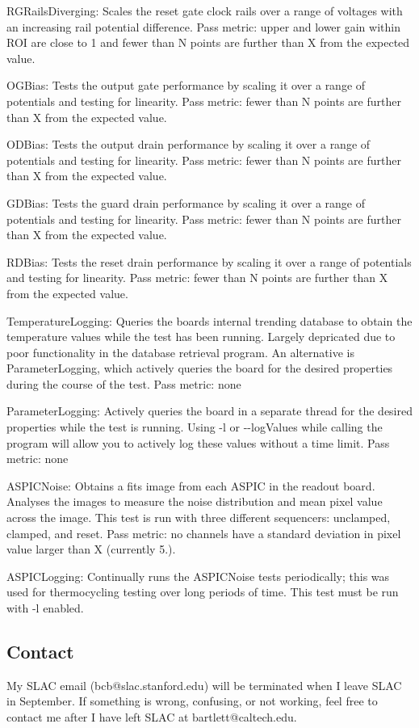\begin{DoxyItemize}
\item {\ttfamily R\+G\+Rails\+Diverging}\+: Scales the reset gate clock rails over a range of voltages with an increasing rail potential difference. Pass metric\+: upper and lower gain within R\+OI are close to 1 and fewer than N points are further than X from the expected value.
\item {\ttfamily O\+G\+Bias}\+: Tests the output gate performance by scaling it over a range of potentials and testing for linearity. Pass metric\+: fewer than N points are further than X from the expected value.
\item {\ttfamily O\+D\+Bias}\+: Tests the output drain performance by scaling it over a range of potentials and testing for linearity. Pass metric\+: fewer than N points are further than X from the expected value.
\item {\ttfamily G\+D\+Bias}\+: Tests the guard drain performance by scaling it over a range of potentials and testing for linearity. Pass metric\+: fewer than N points are further than X from the expected value.
\item {\ttfamily R\+D\+Bias}\+: Tests the reset drain performance by scaling it over a range of potentials and testing for linearity. Pass metric\+: fewer than N points are further than X from the expected value.
\item {\ttfamily Temperature\+Logging}\+: Queries the board\textquotesingle{}s internal trending database to obtain the temperature values while the test has been running. Largely depricated due to poor functionality in the database retrieval program. An alternative is {\ttfamily Parameter\+Logging}, which actively queries the board for the desired properties during the course of the test. Pass metric\+: none
\item {\ttfamily Parameter\+Logging}\+: Actively queries the board in a separate thread for the desired properties while the test is running. Using {\ttfamily -\/l} or {\ttfamily -\/-\/log\+Values} while calling the program will allow you to actively log these values without a time limit. Pass metric\+: none
\item {\ttfamily A\+S\+P\+I\+C\+Noise}\+: Obtains a fits image from each A\+S\+P\+IC in the readout board. Analyses the images to measure the noise distribution and mean pixel value across the image. This test is run with three different sequencers\+: unclamped, clamped, and reset. Pass metric\+: no channels have a standard deviation in pixel value larger than X (currently 5.).
\item {\ttfamily A\+S\+P\+I\+C\+Logging}\+: Continually runs the A\+S\+P\+I\+C\+Noise tests periodically; this was used for thermocycling testing over long periods of time. This test must be run with {\ttfamily -\/l} enabled.
\end{DoxyItemize}

\subsection*{Contact}

My S\+L\+AC email ({\ttfamily bcb@slac.\+stanford.\+edu}) will be terminated when I leave S\+L\+AC in September. If something is wrong, confusing, or not working, feel free to contact me after I have left S\+L\+AC at {\ttfamily bartlett@caltech.\+edu}. 